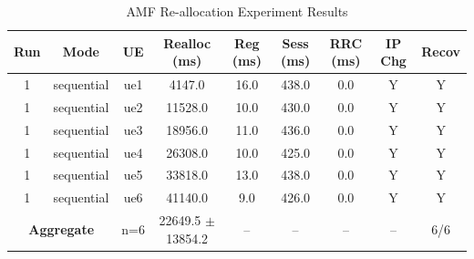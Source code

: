 \begin{table}[ht]
\centering
\begin{tabular}{|c|c|c|c|c|c|c|c|c|}
\hline
Run & Mode & UE & Realloc (ms) & Reg (ms) & Sess (ms) & RRC (ms) & IP Chg & Recov \\
\hline
1 & sequential & ue1 & 4147.0 & 16.0 & 438.0 & 0.0 & Y & Y \\
1 & sequential & ue2 & 11528.0 & 10.0 & 430.0 & 0.0 & Y & Y \\
1 & sequential & ue3 & 18956.0 & 11.0 & 436.0 & 0.0 & Y & Y \\
1 & sequential & ue4 & 26308.0 & 10.0 & 425.0 & 0.0 & Y & Y \\
1 & sequential & ue5 & 33818.0 & 13.0 & 438.0 & 0.0 & Y & Y \\
1 & sequential & ue6 & 41140.0 & 9.0 & 426.0 & 0.0 & Y & Y \\
\multicolumn{2}{|c|}{\textbf{Aggregate}} & n=6 & 22649.5 $\pm$ 13854.2 & -- & -- & -- & -- & 6/6 \\
\hline
\end{tabular}
\caption{AMF Re-allocation Experiment Results}
\label{tab:amf_realloc}
\end{table}

